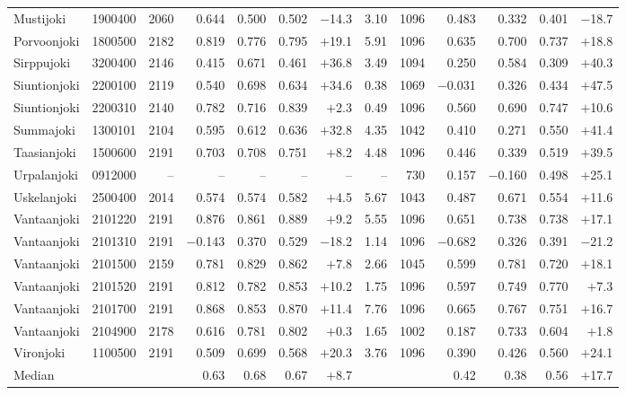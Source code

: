 \documentclass[draft]{agujournal2019}
\begin{document}
\begin{table}[p]
{\begin{tabular}{llr rrrr r rrrr r}
Mustijoki        & 1900400 & 2060 &   0.644 &   0.500 &  0.502 &  $-$14.3 &  3.10 & 1096 &   0.483 &   0.332 &  0.401 &  $-$18.7 \\
Porvoonjoki      & 1800500 & 2182 &   0.819 &   0.776 &  0.795 &  $+$19.1 &  5.91 & 1096 &   0.635 &   0.700 &  0.737 &  $+$18.8 \\
Sirppujoki       & 3200400 & 2146 &   0.415 &   0.671 &  0.461 &  $+$36.8 &  3.49 & 1094 &   0.250 &   0.584 &  0.309 &  $+$40.3 \\
Siuntionjoki     & 2200100 & 2119 &   0.540 &   0.698 &  0.634 &  $+$34.6 &  0.38 & 1069 & $-$0.031 &   0.326 &  0.434 &  $+$47.5 \\
Siuntionjoki     & 2200310 & 2140 &   0.782 &   0.716 &  0.839 &   $+$2.3 &  0.49 & 1096 &   0.560 &   0.690 &  0.747 &  $+$10.6 \\
Summajoki        & 1300101 & 2104 &   0.595 &   0.612 &  0.636 &  $+$32.8 &  4.35 & 1042 &   0.410 &   0.271 &  0.550 &  $+$41.4 \\
Taasianjoki      & 1500600 & 2191 &   0.703 &   0.708 &  0.751 &   $+$8.2 &  4.48 & 1096 &   0.446 &   0.339 &  0.519 &  $+$39.5 \\
Urpalanjoki      & 0912000 &    -- &      -- &      -- &     -- &       -- &    -- &  730 &   0.157 & $-$0.160 &  0.498 &  $+$25.1 \\
Uskelanjoki      & 2500400 & 2014 &   0.574 &   0.574 &  0.582 &   $+$4.5 &  5.67 & 1043 &   0.487 &   0.671 &  0.554 &  $+$11.6 \\
Vantaanjoki      & 2101220 & 2191 &   0.876 &   0.861 &  0.889 &   $+$9.2 &  5.55 & 1096 &   0.651 &   0.738 &  0.738 &  $+$17.1 \\
Vantaanjoki      & 2101310 & 2191 & $-$0.143 &   0.370 &  0.529 &  $-$18.2 &  1.14 & 1096 & $-$0.682 &   0.326 &  0.391 &  $-$21.2 \\
Vantaanjoki      & 2101500 & 2159 &   0.781 &   0.829 &  0.862 &   $+$7.8 &  2.66 & 1045 &   0.599 &   0.781 &  0.720 &  $+$18.1 \\
Vantaanjoki      & 2101520 & 2191 &   0.812 &   0.782 &  0.853 &  $+$10.2 &  1.75 & 1096 &   0.597 &   0.749 &  0.770 &   $+$7.3 \\
Vantaanjoki      & 2101700 & 2191 &   0.868 &   0.853 &  0.870 &  $+$11.4 &  7.76 & 1096 &   0.665 &   0.767 &  0.751 &  $+$16.7 \\
Vantaanjoki      & 2104900 & 2178 &   0.616 &   0.781 &  0.802 &   $+$0.3 &  1.65 & 1002 &   0.187 &   0.733 &  0.604 &   $+$1.8 \\
Vironjoki        & 1100500 & 2191 &   0.509 &   0.699 &  0.568 &  $+$20.3 &  3.76 & 1096 &   0.390 &   0.426 &  0.560 &  $+$24.1 \\
\midrule
\multicolumn{2}{l}{Median} & & 0.63 & 0.68 & 0.67 & $+$8.7 & & & 0.42 & 0.38 & 0.56 & $+$17.7 \\
\bottomrule
\end{tabular}%
}
\end{table}
\end{document}
